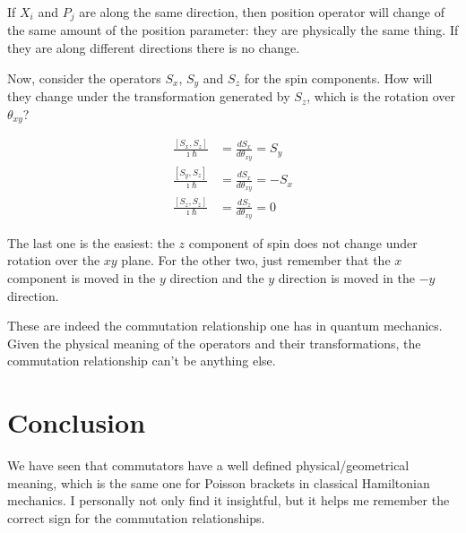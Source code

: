 \documentclass[aps,pra,10pt,floatfix,nofootinbib]{revtex4-1}
\theoremstyle{definition}
\begin{document}
If $X_i$ and $P_j$ are along the same direction, then position operator will change of the same amount of the position parameter: they are physically the same thing. If they are along different directions there is no change.

Now, consider the operators $S_x$, $S_y$ and $S_z$ for the spin components. How will they change under the transformation generated by $S_z$, which is the rotation over $\theta_{xy}$?

\begin{equation}
\begin{aligned}
\frac{[S_x,S_z]}{\imath \hbar} &= \frac{dS_x}{d\theta_{xy}} = S_y \\
\frac{[S_y,S_z]}{\imath \hbar} &= \frac{dS_x}{d\theta_{xy}} = - S_x \\
\frac{[S_z,S_z]}{\imath \hbar} &= \frac{dS_z}{d\theta_{xy}} = 0
\end{aligned}
\end{equation}

The last one is the easiest: the $z$ component of spin does not change under rotation over the $xy$ plane. For the other two, just remember that the $x$ component is moved in the $y$ direction and the $y$ direction is moved in the $-y$ direction.

These are indeed the commutation relationship one has in quantum mechanics. Given the physical meaning of the operators and their transformations, the commutation relationship can't be anything else.

\section{Conclusion}

We have seen that commutators have a well defined physical/geometrical meaning, which is the same one for Poisson brackets in classical Hamiltonian mechanics. I personally not only find it insightful, but it helps me remember the correct sign for the commutation relationships.
\end{document}
